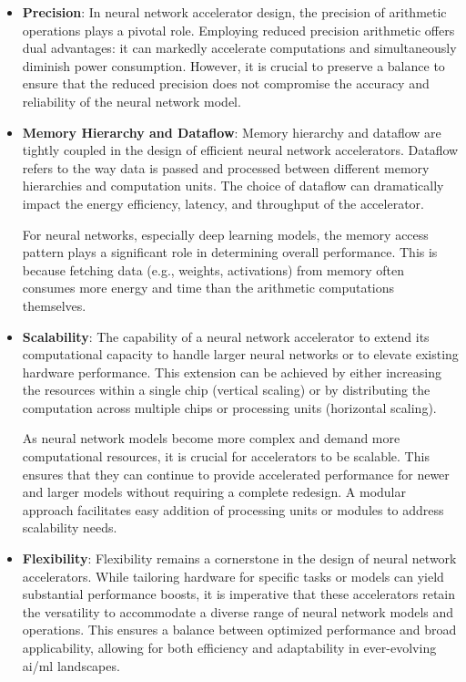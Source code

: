 \begin{itemize}
	\item \textbf{Precision}: In neural network accelerator design, the precision of arithmetic operations plays a pivotal role. Employing reduced precision arithmetic offers dual advantages: it can markedly accelerate computations and simultaneously diminish power consumption. However, it is crucial to preserve a balance to ensure that the reduced precision does not compromise the accuracy and reliability of the neural network model.
	
	\item \textbf{Memory Hierarchy and Dataflow}: Memory hierarchy and dataflow are tightly coupled in the design of efficient neural network accelerators. Dataflow refers to the way data is passed and processed between different memory hierarchies and computation units. The choice of dataflow can dramatically impact the energy efficiency, latency, and throughput of the accelerator.
	
	For neural networks, especially deep learning models, the memory access pattern plays a significant role in determining overall performance. This is because fetching data (e.g., weights, activations) from memory often consumes more energy and time than the arithmetic computations themselves.
	\item \textbf{Scalability}: The capability of a neural network accelerator to extend its computational capacity to handle larger neural networks or to elevate existing hardware performance. This extension can be achieved by either increasing the resources within a single chip (vertical scaling) or by distributing the computation across multiple chips or processing units (horizontal scaling).
	
	As neural network models become more complex and demand more computational resources, it is crucial for accelerators to be scalable. This ensures that they can continue to provide accelerated performance for newer and larger models without requiring a complete redesign.
	A modular approach facilitates easy addition of processing units or modules to address scalability needs.
	\item \textbf{Flexibility}: Flexibility remains a cornerstone in the design of neural network accelerators. While tailoring hardware for specific tasks or models can yield substantial performance boosts, it is imperative that these accelerators retain the versatility to accommodate a diverse range of neural network models and operations. This ensures a balance between optimized performance and broad applicability, allowing for both efficiency and adaptability in ever-evolving \gls{ai}/\gls{ml} landscapes.
	
\end{itemize}

